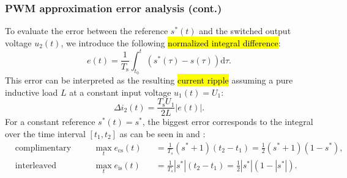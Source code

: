 \begin{frame}
	\frametitle{PWM approximation error analysis (cont.)}
	To evaluate the error between the reference $s^*(t)$ and the switched output voltage $u_2(t)$, we introduce the following \hl{normalized integral difference}:
	\begin{equation}
		e(t) = \frac{1}{T_\mathrm{s}}\int_{t_0}^{t}\left(s^*(\tau)-s(\tau)\right)\mathrm{d}\tau.
	\end{equation}\pause
	This error can be interpreted as the resulting \hl{current ripple} assuming a pure inductive load $L$ at a constant input voltage $u_1(t)=U_1$:
	\begin{equation}
		\Delta i_2(t) = \frac{T_\mathrm{s}U_1}{2 L } \left|e(t)\right|.
		\label{eq:current_ripple_PWM_single_phase_ACDC}
	\end{equation}\pause
	For a constant reference $s^*(t)=s^*$, the biggest error corresponds to the integral over the time interval $[t_1, t_2]$ as can be seen in  and :
	\begin{equation}
		\begin{alignedat}{3}
			 & \mbox{complimentary switching (cs):}\quad &  & \max_t e_{\mathrm{cs}}(t) &  & = \frac{1}{T_s}\left(s^* + 1\right)\left(t_2-t_1\right) = \frac{1}{2}\left(s^* + 1\right)\left(1-s^*\right),      \\
			 & \mbox{interleaved switching (is):}\quad   &  & \max_t e_{\mathrm{is}}(t) &  & = \frac{1}{T_s}\left|s^*\right|\left(t_2-t_1\right) = \frac{1}{2}\left|s^*\right|\left(1-\left|s^*\right|\right).
		\end{alignedat}
		\label{eq:max_errors_comp_int_PWM_signle_phase}
	\end{equation}
\end{frame}

